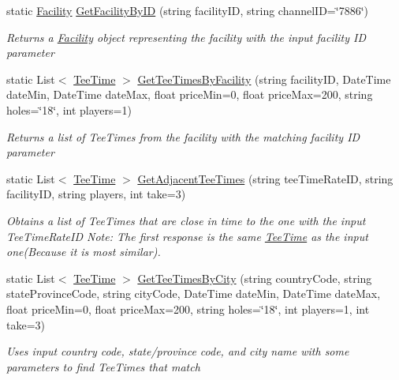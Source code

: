\begin{DoxyCompactItemize}
static \mbox{\hyperlink{class_golf_now_a_p_i_1_1_facility}{Facility}} \mbox{\hyperlink{class_golf_now_a_p_i_1_1_golf_now_a_p_i_handler_a138feb411a0ff70a56592cc27fc21871}{Get\+Facility\+By\+ID}} (string facility\+ID, string channel\+ID=\char`\"{}7886\char`\"{})
\begin{DoxyCompactList}\small\item\em Returns a \mbox{\hyperlink{class_golf_now_a_p_i_1_1_facility}{Facility}} object representing the facility with the input facility ID parameter \end{DoxyCompactList}\item 
static List$<$ \mbox{\hyperlink{class_golf_now_a_p_i_1_1_tee_time}{Tee\+Time}} $>$ \mbox{\hyperlink{class_golf_now_a_p_i_1_1_golf_now_a_p_i_handler_a706be4f71d1c4a8f34281a4c364c98a1}{Get\+Tee\+Times\+By\+Facility}} (string facility\+ID, Date\+Time date\+Min, Date\+Time date\+Max, float price\+Min=0, float price\+Max=200, string holes=\char`\"{}18\char`\"{}, int players=1)
\begin{DoxyCompactList}\small\item\em Returns a list of Tee\+Times from the facility with the matching facility ID parameter \end{DoxyCompactList}\item 
static List$<$ \mbox{\hyperlink{class_golf_now_a_p_i_1_1_tee_time}{Tee\+Time}} $>$ \mbox{\hyperlink{class_golf_now_a_p_i_1_1_golf_now_a_p_i_handler_a0b8fc4a17e1a9a19354d6d3639351578}{Get\+Adjacent\+Tee\+Times}} (string tee\+Time\+Rate\+ID, string facility\+ID, string players, int take=3)
\begin{DoxyCompactList}\small\item\em Obtains a list of Tee\+Times that are close in time to the one with the input Tee\+Time\+Rate\+ID Note\+: The first response is the same \mbox{\hyperlink{class_golf_now_a_p_i_1_1_tee_time}{Tee\+Time}} as the input one(\+Because it is most similar). \end{DoxyCompactList}\item 
static List$<$ \mbox{\hyperlink{class_golf_now_a_p_i_1_1_tee_time}{Tee\+Time}} $>$ \mbox{\hyperlink{class_golf_now_a_p_i_1_1_golf_now_a_p_i_handler_a99d2a8b9ee4da0a3bd0bcf4274b8ee53}{Get\+Tee\+Times\+By\+City}} (string country\+Code, string state\+Province\+Code, string city\+Code, Date\+Time date\+Min, Date\+Time date\+Max, float price\+Min=0, float price\+Max=200, string holes=\char`\"{}18\char`\"{}, int players=1, int take=3)
\begin{DoxyCompactList}\small\item\em Uses input country code, state/province code, and city name with some parameters to find Tee\+Times that match \end{DoxyCompactList}\item 

\end{DoxyCompactItemize}
